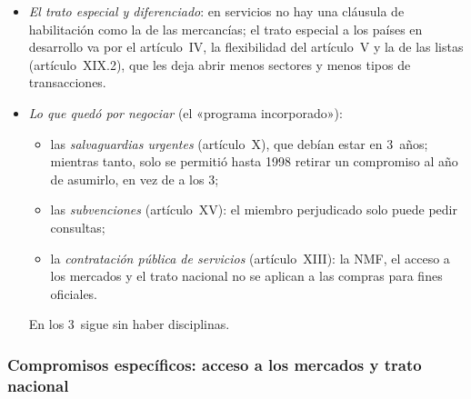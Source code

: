 \documentclass[11pt]{article}
\begin{document}
\begin{itemize}
\begin{enumerate}
  \end{enumerate}
\item \emph{El trato especial y diferenciado}: en servicios no hay una cláusula de habilitación como la de las mercancías; el trato especial a los países en desarrollo va por el artículo~IV, la flexibilidad del artículo~V y la de las listas (artículo~XIX.2), que les deja abrir menos sectores y menos tipos de transacciones.
\item \emph{Lo que quedó por negociar} (el «programa incorporado»):
  \begin{itemize}
  \item las \emph{salvaguardias urgentes} (artículo~X), que debían estar en 3~años; mientras tanto, solo se permitió hasta 1998 retirar un compromiso al año de asumirlo, en vez de a los 3;
  \item las \emph{subvenciones} (artículo~XV): el miembro perjudicado solo puede pedir consultas;
  \item la \emph{contratación pública de servicios} (artículo~XIII): la NMF, el acceso a los mercados y el trato nacional no se aplican a las compras para fines oficiales.
  \end{itemize}
  En los 3~sigue sin haber disciplinas.
\end{itemize}

\subsubsection{Compromisos específicos: acceso a los mercados\cortetitulo{} y trato nacional}\label{sec:compromisos}
\end{document}
